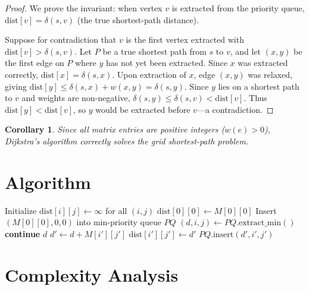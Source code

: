 \documentclass[12pt]{article}
\newtheorem{corollary}{Corollary}
\begin{document}
\begin{proof}
We prove the invariant: when vertex $v$ is extracted from the priority queue, $\mathrm{dist}[v] = \delta(s,v)$ (the true shortest-path distance).

Suppose for contradiction that $v$ is the first vertex extracted with $\mathrm{dist}[v] > \delta(s,v)$. Let $P$ be a true shortest path from $s$ to $v$, and let $(x,y)$ be the first edge on $P$ where $y$ has not yet been extracted. Since $x$ was extracted correctly, $\mathrm{dist}[x] = \delta(s,x)$. Upon extraction of $x$, edge $(x,y)$ was relaxed, giving $\mathrm{dist}[y] \leq \delta(s,x) + w(x,y) = \delta(s,y)$. Since $y$ lies on a shortest path to $v$ and weights are non-negative, $\delta(s,y) \leq \delta(s,v) < \mathrm{dist}[v]$. Thus $\mathrm{dist}[y] < \mathrm{dist}[v]$, so $y$ would be extracted before $v$---a contradiction.
\end{proof}

\begin{corollary}
Since all matrix entries are positive integers ($w(e) > 0$), Dijkstra's algorithm correctly solves the grid shortest-path problem.
\end{corollary}

\section{Algorithm}

\begin{algorithm}[H]
\caption{Minimum Path Sum (Four Ways) via Dijkstra}
\begin{algorithmic}[1]
\STATE Initialize $\mathrm{dist}[i][j] \gets \infty$ for all $(i,j)$
\STATE $\mathrm{dist}[0][0] \gets M[0][0]$
\STATE Insert $(M[0][0], 0, 0)$ into min-priority queue $PQ$
    \STATE $(d, i, j) \gets PQ.\text{extract\_min}()$
        \STATE \textbf{continue} 
    \ENDIF
        \RETURN $d$
    \ENDIF
        \STATE $d' \gets d + M[i'][j']$
            \STATE $\mathrm{dist}[i'][j'] \gets d'$
            \STATE $PQ.\text{insert}(d', i', j')$
        \ENDIF
    \ENDFOR
\ENDWHILE
\end{algorithmic}
\end{algorithm}

\section{Complexity Analysis}
\end{document}
